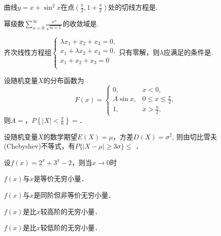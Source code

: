 \documentclass[plain,noanswer,medmath]{../../template/jnuexam}
\begin{document}






\begin{problem}
曲线$y=x+\sin^2 x$在点$\left(\frac{\pi}{2},1+\frac{\pi}{2}\right)$处的切线方程是\fillin{}.
\end{problem}


\begin{problem}
幂级数$\sum_{n=0}^{\infty}\frac{x^n}{\sqrt{n+1}}$的收敛域是\fillin{}.
\end{problem}


\begin{problem}
齐次线性方程组$\begin{cases}
  \lambda x_1+x_2+x_3=0, \\
  x_1+\lambda x_2+x_3=0, \\
  x_1+x_2+x_3=0 \\
\end{cases}$只有零解，则$\lambda$应满足的条件是\fillin{}.
\end{problem}


\begin{problem}
设随机变量$X$的分布函数为
$$F(x)=\begin{cases}
        0, & x<0, \\
  A\sin x, & 0\le x\le \frac{\pi}{2}, \\
        1, & x>\frac{\pi}{2},
\end{cases}$$
则$A=$\fillin{}，$P\left\{|X|<\frac{\pi}{6}\right\}=$\fillin{}．
\end{problem}


\begin{problem}
设随机变量$X$的数学期望$E(X)=\mu$，方差$D(X)=\sigma^2$,
则由切比雪夫(Chebyshev)不等式，有$P\{|X-\mu|\ge 3\sigma\}\le$ \fillin{}．
\end{problem}



\begin{problem}
设$f(x)=2^x+3^x-2$，则当$x\to 0$时 \pickout{}
\begin{abcd}
\item $f(x)$与$x$是等价无穷小量．
\item $f(x)$与$x$是同阶但非等价无穷小量．
\item $f(x)$是比$x$较高阶的无穷小量．
\item $f(x)$是比$x$较低阶的无穷小量．
\end{abcd}
\end{problem}
\end{document}

